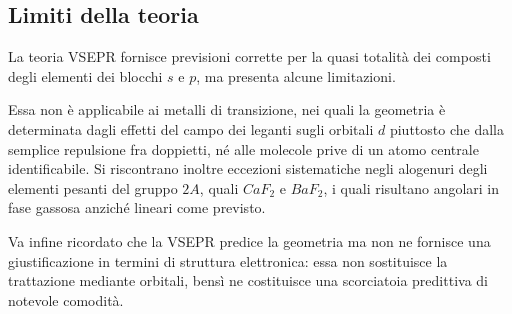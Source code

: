 \subsection{Limiti della teoria}

La teoria VSEPR fornisce previsioni corrette per la quasi totalità dei composti degli elementi dei blocchi $s$ e $p$, ma presenta alcune limitazioni.

Essa non è applicabile ai metalli di transizione, nei quali la geometria è determinata dagli effetti del campo dei leganti sugli orbitali $d$ piuttosto che dalla semplice repulsione fra doppietti, né alle molecole prive di un atomo centrale identificabile. Si riscontrano inoltre eccezioni sistematiche negli alogenuri degli elementi pesanti del gruppo $2A$, quali $CaF_2$ e $BaF_2$, i quali risultano angolari in fase gassosa anziché lineari come previsto.

Va infine ricordato che la VSEPR predice la geometria ma non ne fornisce una giustificazione in termini di struttura elettronica: essa non sostituisce la trattazione mediante orbitali, bensì ne costituisce una scorciatoia predittiva di notevole comodità.
